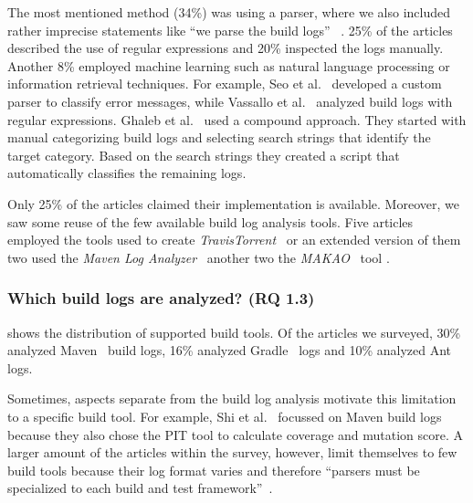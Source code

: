 The most mentioned method (34\%) was using a parser, where we also
included
rather imprecise statements like ``we parse the build logs''
~\cite{rahman2018impact}.
25\% of the articles described the use of regular expressions and 20\%
inspected the logs manually.
Another 8\% employed machine learning such as natural language
processing or information retrieval techniques.
For example,
Seo et al.~\cite{seo2014programmers} developed a custom
parser to classify error messages, while Vassallo et
al.~\cite{vassallo2017a-tale} analyzed build logs with regular
expressions.
Ghaleb et al.~\cite{ghaleb2019studying} used a compound approach.
They started with manual categorizing build logs and selecting
search strings that identify the target category.
Based on the search strings they created a script that automatically
classifies the remaining logs.

Only 25\% of the articles claimed their implementation is available.
Moreover, we
saw some reuse of the few available build log analysis tools.
Five articles employed the tools used to create
\emph{TravisTorrent}~\cite{beller2017travistorrent,beller2017oops,
orellana2017differences,zhao2018comparing} or
an extended version of them~\cite{rott2019empirische,
shi2018evaluating}
two used the
\emph{Maven Log Analyzer}~\cite{macho2018automatically,gallaba2018noise}
another two the
\emph{MAKAO}~\cite{wen2018blimp,adams2007design,adams2007makao} tool
.

\subsubsection{Which build logs are analyzed? (RQ 1.3)}
 shows the distribution of supported
build tools.
Of the articles we surveyed, 30\% analyzed
Maven~\cite{maven2019website} build logs,
16\% analyzed Gradle~\cite{gradle2020website} logs
and 10\% analyzed Ant~\cite{ant2020website} logs.

Sometimes, aspects separate from the build log analysis motivate
this limitation to a specific build tool.
For example, Shi et al.~\cite{shi2018evaluating} focussed on Maven
build logs because they also chose the PIT tool to calculate coverage
and mutation score.
A larger amount of the articles within the survey, however, limit
themselves to few build tools because their log format varies and
therefore ``parsers must be specialized to each build and test
framework''~\cite{tomassi2019bugswarm}.


